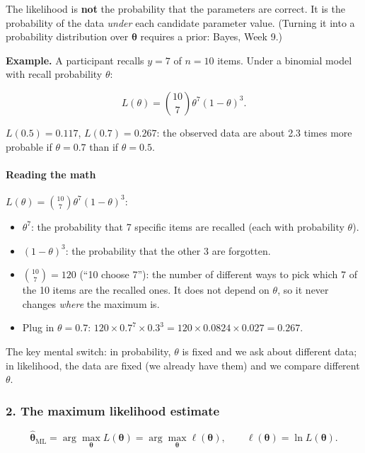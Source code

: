 The likelihood is \textbf{not} the probability that the parameters are
correct. It is the probability of the data \emph{under} each candidate
parameter value. (Turning it into a probability distribution over
\(\boldsymbol\theta\) requires a prior: Bayes, Week 9.)

\textbf{Example.} A participant recalls \(y = 7\) of \(n = 10\) items.
Under a binomial model with recall probability \(\theta\):

\[
L(\theta) = \binom{10}{7}\theta^{7}(1-\theta)^{3}.
\]

\(L(0.5) = 0.117\), \(L(0.7) = 0.267\): the observed data are about 2.3
times more probable if \(\theta = 0.7\) than if \(\theta = 0.5\).

\paragraph{Reading the math}

\(L(\theta) = \binom{10}{7}\theta^{7}(1-\theta)^{3}\):

\begin{itemize}
\tightlist
\item
  \(\theta^7\): the probability that 7 specific items are recalled (each
  with probability \(\theta\)).
\item
  \((1-\theta)^3\): the probability that the other 3 are forgotten.
\item
  \(\binom{10}{7} = 120\) (``10 choose 7''): the number of different
  ways to pick which 7 of the 10 items are the recalled ones. It does
  not depend on \(\theta\), so it never changes \emph{where} the maximum
  is.
\item
  Plug in \(\theta = 0.7\):
  \(120 \times 0.7^7 \times 0.3^3 = 120 \times 0.0824 \times 0.027 = 0.267\).
\end{itemize}

The key mental switch: in probability, \(\theta\) is fixed and we ask
about different data; in likelihood, the data are fixed (we already have
them) and we compare different \(\theta\).

\subsubsection{2. The maximum likelihood estimate}

\[
\hat{\boldsymbol\theta}_{\text{ML}} = \arg\max_{\boldsymbol\theta} L(\boldsymbol\theta) = \arg\max_{\boldsymbol\theta} \ell(\boldsymbol\theta),
\qquad \ell(\boldsymbol\theta) = \ln L(\boldsymbol\theta).
\]

